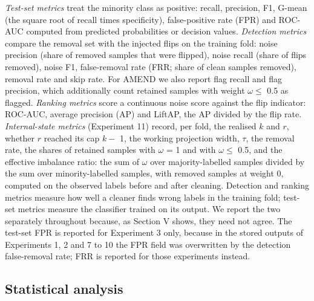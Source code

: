 \documentclass[conference]{IEEEtran}
\begin{document}
\emph{Test-set metrics} treat the minority class as positive: recall, precision, F1, G-mean (the square root of recall times specificity), false-positive rate (FPR) and ROC-AUC computed from predicted probabilities or decision values. \emph{Detection metrics} compare the removal set with the injected flips on the training fold: noise precision (share of removed samples that were flipped), noise recall (share of flips removed), noise F1, false-removal rate (FRR; share of clean samples removed), removal rate and skip rate. For AMEND we also report flag recall and flag precision, which additionally count retained samples with weight $\omega  \le $ 0.5 as flagged. \emph{Ranking metrics} score a continuous noise score against the flip indicator: ROC-AUC, average precision (AP) and LiftAP, the AP divided by the flip rate. \emph{Internal-state metrics} (Experiment 11) record, per fold, the realised $k$ and $r$, whether $r$ reached its cap $k -$ 1, the working projection width, $\tau $, the removal rate, the shares of retained samples with $\omega $ = 1 and with $\omega  \le $ 0.5, and the effective imbalance ratio: the sum of $\omega $ over majority-labelled samples divided by the sum over minority-labelled samples, with removed samples at weight 0, computed on the observed labels before and after cleaning. Detection and ranking metrics measure how well a cleaner finds wrong labels in the training fold; test-set metrics measure the classifier trained on its output. We report the two separately throughout because, as Section V shows, they need not agree. The test-set FPR is reported for Experiment 3 only, because in the stored outputs of Experiments 1, 2 and 7 to 10 the FPR field was overwritten by the detection false-removal rate; FRR is reported for those experiments instead.

\subsection{Statistical analysis}\label{sec:statistical-analysis}
\end{document}

